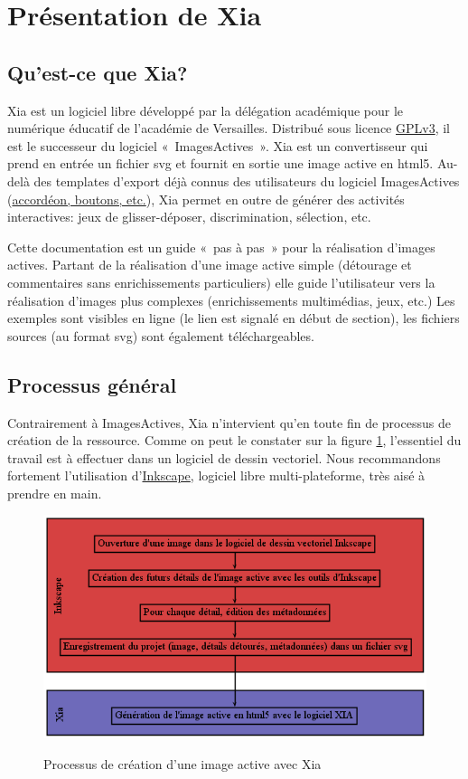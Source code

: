 \documentclass[a4paper,12pt]{report}
\begin{document}
 
\section{Présentation de Xia}

\subsection{Qu'est-ce que Xia?}

Xia est un logiciel libre développé par la délégation académique pour le numérique éducatif de l'académie de Versailles.
Distribué sous licence \href{http://www.gnu.org/copyleft/gpl.html}{GPLv3}, il est le successeur du logiciel «~ImagesActives~».
Xia est un convertisseur qui prend en entrée un fichier svg et fournit en sortie une image active en html5.
Au-delà des templates d'export déjà connus des utilisateurs du logiciel ImagesActives
(\href{http://images-actives.crdp-versailles.fr/spip.php?article11&lang=fr}{accordéon, boutons, etc.}),
Xia permet en outre de générer des activités interactives: jeux de glisser-déposer, discrimination, sélection, etc.

Cette documentation est un guide «~pas à pas~» pour la réalisation d'images actives.
Partant de la réalisation d'une image active simple (détourage et commentaires sans enrichissements particuliers)
elle guide l'utilisateur vers la réalisation d'images plus complexes (enrichissements multimédias, jeux, etc.)
Les exemples sont visibles en ligne (le lien est signalé en début de section), les fichiers sources (au format svg) 
sont également téléchargeables.

\subsection{Processus général}

Contrairement à ImagesActives, Xia n'intervient qu'en toute fin de processus de création de la ressource.
Comme on peut le constater sur la figure \ref{workflow_xia}, l'essentiel du travail est à effectuer
dans un logiciel de dessin vectoriel.
Nous recommandons fortement l'utilisation d'\href{http://www.inkscape.org/}{Inkscape}, logiciel libre
multi-plateforme, très aisé à prendre en main.

\begin{figure}[htp]
 \centering
 \caption{Processus de création d'une image active avec Xia}
 \includegraphics[width=1\textwidth]{images/workflow_xia}
 \label{workflow_xia}
\end{figure}
\end{document}
